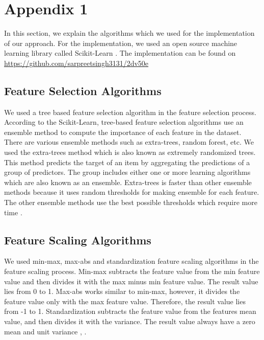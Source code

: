 \documentclass[a4paper,12pt]{article}
\begin{document}
\section{Appendix 1} \label{Appendix}
In this section, we explain the algorithms which we used for the implementation of our approach. For the implementation, we used an open source machine learning library called Scikit-Learn \cite{SLMLIP-2011}. The implementation can be found on \\ \url{https://github.com/sarpreetsingh3131/2dv50e}
\subsection{Feature Selection Algorithms} \label{FeatureSelectionAlgorithms}
We used a tree based feature selection algorithm in the feature selection process. According to the Scikit-Learn, tree-based feature selection algorithms use an ensemble method to compute the importance of each feature in the dataset. There are various ensemble methods such as extra-trees, random forest, etc. We used the extra-trees method which is also known as extremely randomized trees. This method predicts the target of an item by aggregating the predictions of a group of predictors. The group includes either one or more learning algorithms which are also known as an ensemble. Extra-trees is faster than other ensemble methods because it uses random thresholds for making ensemble for each feature. The other ensemble methods use the best possible thresholds which require more time \cite{HOMLWSLATF-2017}.

\subsection{Feature Scaling Algorithms} \label{FeatureScalingAlgorithms}
We used min-max, max-abs and standardization feature scaling algorithms in the feature scaling process. Min-max subtracts the feature value from the min feature value and then divides it with the max minus min feature value. The result value lies from 0 to 1. Max-abs works similar to min-max, however, it divides the feature value only with the max feature value. Therefore, the result value lies from -1 to 1. Standardization subtracts the feature value from the features mean value, and then divides it with the variance. The result value always have a zero mean and unit variance \cite{HOMLWSLATF-2017}, \cite{SLMLIP-2011}. 
\end{document}
